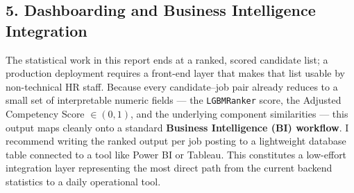 \subsection{5. Dashboarding and Business Intelligence Integration}
The statistical work in this report ends at a ranked, scored candidate list; a production deployment requires a front-end layer that makes that list usable by non-technical HR staff. Because every candidate--job pair already reduces to a small set of interpretable numeric fields --- the \texttt{LGBMRanker} score, the Adjusted Competency Score $\in (0,1)$, and the underlying component similarities --- this output maps cleanly onto a standard \textbf{Business Intelligence (BI) workflow}. I recommend writing the ranked output per job posting to a lightweight database table connected to a tool like Power BI or Tableau. This constitutes a low-effort integration layer representing the most direct path from the current backend statistics to a daily operational tool.
